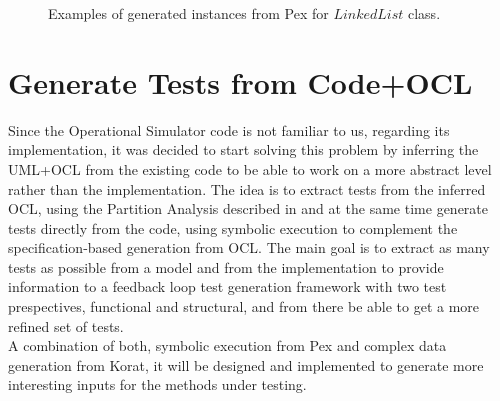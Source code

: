 \documentclass[a4paper,UKenglish]{oasics}
\begin{document}
\begin{figure}[!ht]
\centerline{
\hfil
{}}
\caption{Examples of generated instances from Pex for $LinkedList$ class.}
\label{fig:pexG}
\end{figure}

\section{Generate Tests from Code+OCL}\label{proposal}
Since the Operational Simulator code is not familiar to us, regarding its implementation, it was decided to start solving this problem by inferring the UML+OCL from the existing code
to be able to work on a more abstract level rather than the implementation.
The idea is to extract tests from the inferred OCL, using the Partition Analysis described
in \cite{Benattou02generatingtest} and at the same time generate tests directly from the code, using symbolic execution to complement
the specification-based generation from OCL. The main goal is to extract as many tests as possible from a model and from the implementation 
to provide information to a feedback loop\cite{Xie03mutuallyenhancing}
test generation framework with two test prespectives, functional and structural, and from there be able to get a more refined set of tests.\\
A combination of both, symbolic execution from Pex and complex data generation from Korat, it will be designed and implemented to
generate more interesting inputs for the methods under testing.
\end{document}
